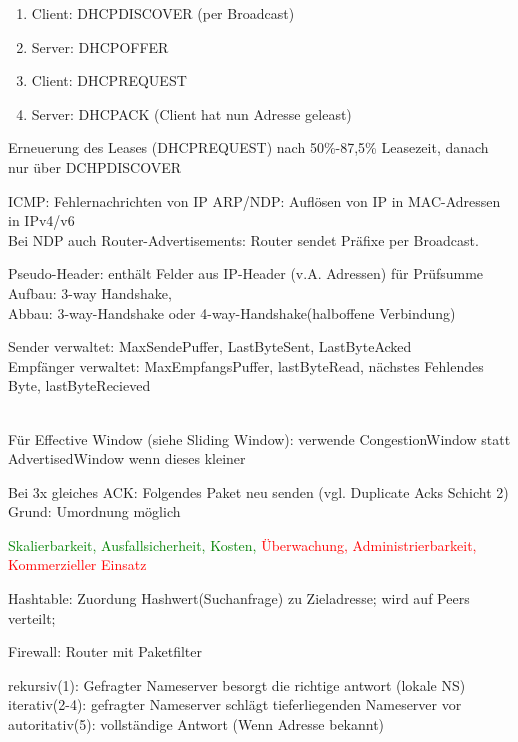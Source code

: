 \begin{enumerate}
\item Client: DHCPDISCOVER (per Broadcast)
\item Server: DHCPOFFER 
\item Client: DHCPREQUEST
\item Server: DHCPACK (Client hat nun Adresse geleast)
\end{enumerate}
Erneuerung des Leases (DHCPREQUEST) nach 50\%-87,5\% Leasezeit, danach nur über DCHPDISCOVER


ICMP: Fehlernachrichten von IP
ARP/NDP: Auflösen von IP in MAC-Adressen in IPv4/v6	\\
Bei NDP auch Router-Advertisements: Router sendet Präfixe per Broadcast.

Pseudo-Header: enthält Felder aus IP-Header (v.A. Adressen) für Prüfsumme\\
Aufbau: 3-way Handshake, \\
Abbau: 3-way-Handshake oder 4-way-Handshake(halboffene Verbindung)

Sender verwaltet: MaxSendePuffer, LastByteSent, LastByteAcked\\
Empfänger verwaltet: MaxEmpfangsPuffer, lastByteRead, nächstes Fehlendes Byte, lastByteRecieved

\\
Für Effective Window (siehe Sliding Window): verwende CongestionWindow statt AdvertisedWindow wenn dieses kleiner


Bei 3x gleiches ACK: Folgendes Paket neu senden (vgl. Duplicate Acks Schicht 2) Grund: Umordnung möglich



\textcolor{green}{Skalierbarkeit, Ausfallsicherheit, Kosten,} \textcolor{red}{Überwachung, Administrierbarkeit, Kommerzieller Einsatz}

Hashtable: Zuordung Hashwert(Suchanfrage) zu Zieladresse; wird auf Peers verteilt;





Firewall: Router mit Paketfilter 

rekursiv(1): Gefragter Nameserver besorgt die richtige antwort (lokale NS)\\
iterativ(2-4): gefragter Nameserver schlägt tieferliegenden Nameserver vor\\
autoritativ(5): vollständige Antwort (Wenn Adresse bekannt)\\


